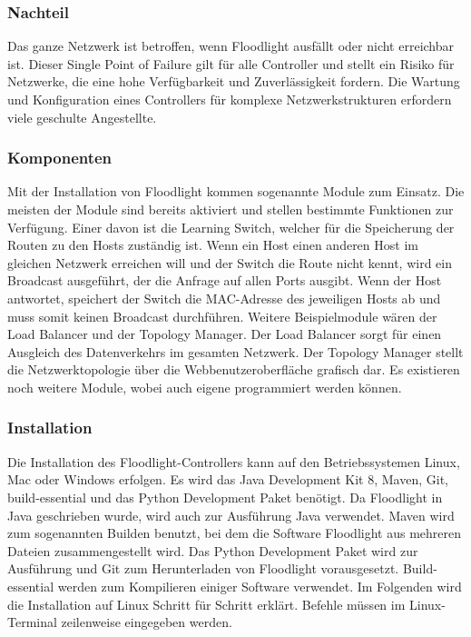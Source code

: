 \documentclass[fontsize=12pt,paper=a4,open=any,parskip=half,
  twoside=false,toc=listof,toc=bibliography,fleqn,leqno,
  captions=nooneline,captions=tableabove,british]{scrbook}
\begin{document}
\subsubsection{Nachteil}
Das ganze Netzwerk ist betroffen, wenn Floodlight ausfällt oder nicht erreichbar ist. Dieser Single Point of Failure gilt für alle Controller und stellt ein Risiko für Netzwerke, die eine hohe Verfügbarkeit und Zuverlässigkeit fordern. Die Wartung und Konfiguration eines Controllers für komplexe Netzwerkstrukturen erfordern viele geschulte Angestellte.

\subsubsection{Komponenten}
Mit der Installation von Floodlight kommen sogenannte Module zum Einsatz. Die meisten der Module sind bereits aktiviert und stellen bestimmte Funktionen zur Verfügung. Einer davon ist die Learning Switch, welcher für die Speicherung der Routen zu den Hosts zuständig ist. Wenn ein Host einen anderen Host im gleichen Netzwerk erreichen will und der Switch die Route nicht kennt, wird ein Broadcast ausgeführt, der die Anfrage auf allen Ports ausgibt. Wenn der Host antwortet, speichert der Switch die MAC-Adresse des jeweiligen Hosts ab und muss somit keinen Broadcast durchführen. Weitere Beispielmodule wären der Load Balancer und der Topology Manager. Der Load Balancer sorgt für einen Ausgleich des Datenverkehrs im gesamten Netzwerk. Der Topology Manager stellt die Netzwerktopologie über die Webbenutzeroberfläche grafisch dar. Es existieren noch weitere Module, wobei auch eigene programmiert werden können.

\subsubsection{Installation}
Die Installation des Floodlight-Controllers kann auf den Betriebssystemen Linux, Mac oder Windows erfolgen. Es wird das Java Development Kit 8, Maven, Git, build-essential und das Python Development Paket benötigt. Da Floodlight in Java geschrieben wurde, wird auch zur Ausführung Java verwendet. Maven wird zum sogenannten Builden benutzt, bei dem die Software Floodlight aus mehreren Dateien zusammengestellt wird. Das Python Development Paket wird zur Ausführung und Git zum Herunterladen von Floodlight vorausgesetzt. Build-essential werden zum Kompilieren einiger Software verwendet. Im Folgenden wird die Installation auf Linux Schritt für Schritt erklärt. Befehle müssen im Linux-Terminal zeilenweise eingegeben werden.
\end{document}
